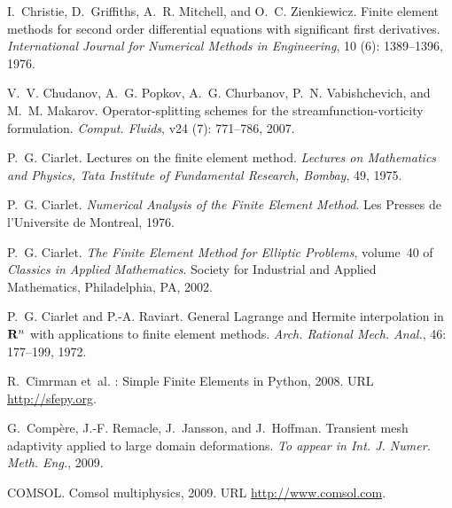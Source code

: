 \begin{thebibliography}{467}
I.~Christie, D.~Griffiths, A.~R. Mitchell, and O.~C. Zienkiewicz.
\newblock Finite element methods for second order differential equations with
  significant first derivatives.
\newblock \emph{International Journal for Numerical Methods in Engineering},
  10 (6): 1389--1396, 1976.

V.~V. Chudanov, A.~G. Popkov, A.~G. Churbanov, P.~N. Vabishchevich, and M.~M.
  Makarov.
\newblock Operator-splitting schemes for the streamfunction-vorticity
  formulation.
\newblock \emph{Comput. Fluids}, v24 (7): 771--786, 2007.

P.~G. Ciarlet.
\newblock Lectures on the finite element method.
\newblock \emph{Lectures on Mathematics and Physics, Tata Institute of
  Fundamental Research, Bombay}, 49, 1975.

P.~G. Ciarlet.
\newblock \emph{Numerical Analysis of the Finite Element Method}.
\newblock Les Presses de l'Universite de Montreal, 1976.

P.~G. Ciarlet.
\newblock \emph{The Finite Element Method for Elliptic Problems}, volume~40 of
  \emph{Classics in Applied Mathematics}.
\newblock Society for Industrial and Applied Mathematics, Philadelphia, PA,
  2002.

P.~G. Ciarlet and P.-A. Raviart.
\newblock General {L}agrange and {H}ermite interpolation in {${\bf R}\sp{n}$}
  with applications to finite element methods.
\newblock \emph{Arch. Rational Mech. Anal.}, 46: 177--199, 1972.

R.~Cimrman et~al.
: {S}imple {F}inite {E}lements in {P}ython, 2008.
\newblock URL \url{http://sfepy.org}.

G.~Comp\`{e}re, J.-F. Remacle, J.~Jansson, and J.~Hoffman.
\newblock Transient mesh adaptivity applied to large domain deformations.
\newblock \emph{To appear in Int. J. Numer. Meth. Eng.}, 2009.

COMSOL.
\newblock Comsol multiphysics, 2009.
\newblock URL \url{http://www.comsol.com}.


\end{thebibliography}
